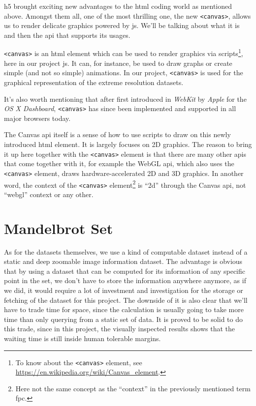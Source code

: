 \gls{h5} brought exciting new advantages to the \gls{html} coding world as mentioned above. Amongst them all, one of the most thrilling one, the new \texttt{<canvas>}, allows us to render delicate graphics powered by \gls{js}. We'll be talking about what it is and then the \gls{api} that supports its usages.

\texttt{<canvas>} is an \gls{html} element which can be used to render graphics via scripts\footnote{ To know about the \texttt{<canvas>} element, see \url{https://en.wikipedia.org/wiki/Canvas_element}.}, here in our project \gls{js}. It can, for instance, be used to draw graphs or create simple (and not so simple) animations. In our project, \texttt{<canvas>} is used for the graphical representation of the extreme resolution datasets.

It's also worth mentioning that after first introduced in \emph{WebKit} by \emph{Apple} for the \emph{OS X Dashboard}, \texttt{<canvas>} has since been implemented and supported in all major browsers today.

The Canvas \gls{api} itself is a sense of how to use scripts to draw on this newly introduced \gls{html} element. It is largely focuses on 2D graphics. The reason to bring it up here together with the \texttt{<canvas>} element is that there are many other \gls{api}s that come together with it, for example the WebGL \gls{api}, which also uses the \texttt{<canvas>} element, draws hardware-accelerated 2D and 3D graphics. In another word, the context of the \texttt{<canvas>} element\footnote{ Here not the same concept as the ``context'' in the previously mentioned term \gls{fpc}.} is ``2d'' through the Canvas \gls{api}, not ``webgl'' context or any other.


\section{Mandelbrot Set}

As for the datasets themselves, we use a kind of computable dataset instead of a static and deep zoomable image information dataset. The advantage is obvious that by using a dataset that can be computed for its information of any specific point in the set, we don't have to store the information anywhere anymore, as if we did, it would require a lot of investment and investigation for the storage or fetching of the dataset for this project. The downside of it is also clear that we'll have to trade time for space, since the calculation is usually going to take more time than only querying from a static set of data. It is proved to be solid to do this trade, since in this project, the visually inspected results shows that the waiting time is still inside human tolerable margins.

